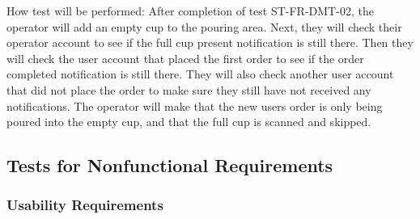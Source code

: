 \documentclass[12pt, titlepage]{article}
\begin{document}
\begin{enumerate}
How test will be performed: After completion of test ST-FR-DMT-02, the operator will add an empty cup to the pouring area. Next, they will check their operator account to see if the full cup present notification is still there. Then they will check the user account that placed the first order to see if the order completed notification is still there. They will also check another user account that did not place the order to make sure they still have not received any notifications. The operator will make that the new users order is only being poured into the empty cup, and that the full cup is scanned and skipped.

\end{enumerate}

\subsection{Tests for Nonfunctional Requirements}



\subsubsection{Usability Requirements}
\end{document}
